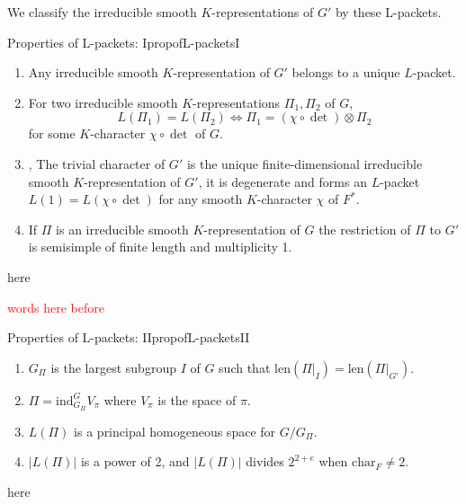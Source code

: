 \documentclass{article}
\begin{document}
We classify the irreducible smooth \(K\)-representations of \(G'\) by these L-packets.

\begin{prop}{Properties of L-packets: I}{propofL-packetsI}
  \begin{enumerate}
    \item  Any irreducible smooth \(K\)-representation of \(G'\) belongs to a unique \(L\)-packet.

    \item For two irreducible smooth \(K\)-representations \(\Pi_1, \Pi_2\) of \(G\),
  \[
    L(\Pi_1) = L(\Pi_2) \iff \Pi_1 = (\chi \circ \det) \otimes \Pi_2
  \]
  for some \(K\)-character \(\chi \circ \det\) of \(G\).

  \item, The trivial character of \(G'\) is the unique finite-dimensional irreducible smooth \(K\)-representation of \(G'\), it is degenerate and forms an \(L\)-packet \(L(1) = L(\chi \circ \det)\) for any smooth \(K\)-character \(\chi\) of \(F^*\).

\item If \(\Pi\) is an irreducible smooth \(K\)-representation of \(G\) the restriction of \(\Pi\) to \(G'\)
  is semisimple of finite length and multiplicity 1.

  \end{enumerate}
\end{prop}

\begin{Proof}
here
\end{Proof}

\textcolor{red}{words here before}

\begin{prop}{Properties of L-packets: II}{propofL-packetsII}
  \begin{enumerate}
  \item \(G_{\Pi}\) is the largest subgroup \(I\) of \(G\) such that \(\mathrm{len}(\Pi|_I) = \mathrm{len}(\Pi|_{G'})\).
  \item \(\Pi = \mathrm{ind}_{G_{\Pi}}^G V_{\pi}\) where \(V_{\pi}\) is the space of \(\pi\).
  \item \(L(\Pi)\) is a principal homogeneous space for \(G/G_{\Pi}\).
  \item \(|L(\Pi)|\) is a power of 2, and \(|L(\Pi)|\) divides \(2^{2+e}\) when \(\mathrm{char}_F \neq 2\).
  \end{enumerate}
\end{prop}

\begin{Proof}
here
\end{Proof}
\end{document}
